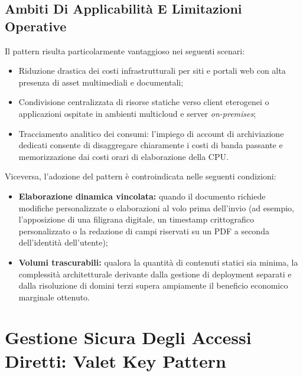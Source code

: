 \documentclass[11pt, a4paper]{article}
\begin{document}
\subsection{Ambiti Di Applicabilità E Limitazioni Operative}

Il pattern risulta particolarmente vantaggioso nei seguenti scenari:
\begin{itemize}[noitemsep]
    \item Riduzione drastica dei costi infrastrutturali per siti e portali web con alta presenza di asset multimediali e documentali;
    \item Condivisione centralizzata di risorse statiche verso client eterogenei o applicazioni ospitate in ambienti multicloud e server \emph{on-premises};
    \item Tracciamento analitico dei consumi: l'impiego di account di archiviazione dedicati consente di disaggregare chiaramente i costi di banda passante e memorizzazione dai costi orari di elaborazione della CPU.
\end{itemize}

Viceversa, l'adozione del pattern è controindicata nelle seguenti condizioni:
\begin{itemize}[noitemsep]
    \item \textbf{Elaborazione dinamica vincolata:} quando il documento richiede modifiche personalizzate o elaborazioni al volo prima dell'invio (ad esempio, l'apposizione di una filigrana digitale, un timestamp crittografico personalizzato o la redazione di campi riservati su un PDF a seconda dell'identità dell'utente);
    \item \textbf{Volumi trascurabili:} qualora la quantità di contenuti statici sia minima, la complessità architetturale derivante dalla gestione di deployment separati e dalla risoluzione di domini terzi supera ampiamente il beneficio economico marginale ottenuto.
\end{itemize}

\newpage


\section{Gestione Sicura Degli Accessi Diretti: Valet Key Pattern}
\end{document}

